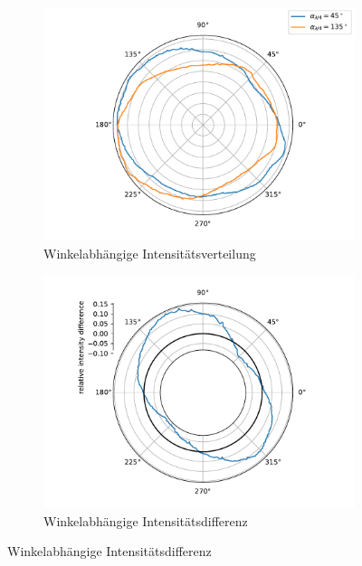 \documentclass[titlepage,  ngerman]{article}
\begin{document}
		\begin{figure}		
			\begin{subfigure}[b]{0.5\textwidth}
				\centering
				\includegraphics[width=\textwidth]{figures/spin_hall/fp_angular_distribution_45_135.pdf}
				\caption{Winkelabhängige Intensitätsverteilung}
				\label{fig:angular_int_fp}
			\end{subfigure}
			\hfill
			\begin{subfigure}[b]{0.49\textwidth}
				\centering
				\includegraphics[width=\textwidth]{figures/spin_hall/fp_angular_distribution_diff_45_135.pdf}
				\caption{Winkelabhängige Intensitätsdifferenz}
				\label{fig:angular_int_diff_fp}
			\end{subfigure}

\end{figure}
\end{document}
